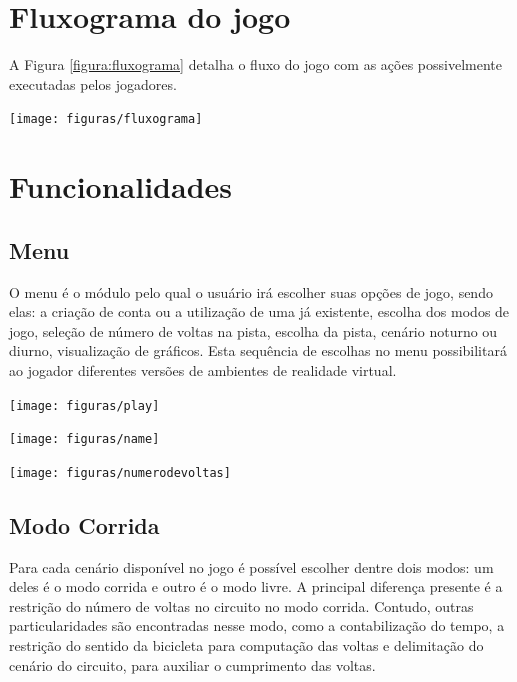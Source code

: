 \section{Fluxograma do jogo}

A Figura \ref{figura:fluxograma} detalha o fluxo do jogo com as ações possivelmente executadas pelos jogadores. 

\begin{center}
	\texttt{[image: figuras/fluxograma]}
	\label{figura:fluxograma}
\end{center}

\section{Funcionalidades}
\subsection{Menu}
O menu é o módulo pelo qual o usuário irá escolher suas opções de jogo, sendo elas: a criação de conta ou a utilização de uma já existente, escolha dos modos de jogo, seleção de número de voltas na pista, escolha da pista, cenário noturno ou diurno, visualização de gráficos. Esta sequência de escolhas no menu possibilitará ao jogador diferentes versões de ambientes de realidade virtual.

\begin{center}
	\texttt{[image: figuras/play]}
	\label{figura:play}
\end{center}

\begin{center}
	\texttt{[image: figuras/name]}
	\label{figura:name}
\end{center}

\begin{center}
	\texttt{[image: figuras/numerodevoltas]}
	\label{figura:numVoltas}
\end{center}

\subsection{Modo Corrida}
\label{corrida}

Para cada cenário disponível no jogo é possível escolher dentre dois modos: um deles é o modo corrida e outro é o modo livre. A principal diferença presente é a restrição do número de voltas no circuito no modo corrida. Contudo, outras particularidades são encontradas nesse modo, como a contabilização do tempo, a restrição do sentido da bicicleta para computação das voltas e delimitação do cenário do circuito, para auxiliar o cumprimento das voltas.

